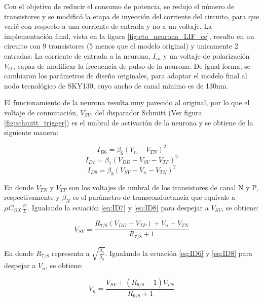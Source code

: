\documentclass[conference]{IEEEtran}
\begin{document}
Con el objetivo de reducir el consumo de potencia, se redujo el número de transistores y se modificó la etapa de inyección del corriente del circuito, para que varié con respecto a una corriente de entrada y no a un voltaje. La implementación final, vista en la figura \ref{fig:cto_neurona_LIF_cc}, resulto en un circuito con 9 transistores (5 menos que el modelo original) y unicamente 2 entradas: La corriente de entrada a la neurona, $I_{in}$ y un voltaje de polarización $V_{b1}$, capaz de modificar la frecuencia de pulso de la neurona. De igual forma, se cambiaron los parámetros de diseño originales, para adaptar el modelo final al nodo tecnológico de SKY130, cuyo ancho de canal mínimo es de 130nm.

El funcionamiento de la neurona resulta muy parecido al original, por lo que el voltaje de conmutación, $V_{SV}$, del disparador Schmitt (Ver figura \ref{fig:schmitt_trigger}) es el umbral de activación de la neurona y se obtiene de la siguiente manera:

\begin{equation}
	I_{D6} = \beta_{6}\left(V_{n}-V_{TN}\right)^{2}
	\label{eq:ID6}
\end{equation}
\begin{equation}
	I_{D7} = \beta_{7}\left(V_{DD}-V_{SV}-V_{TP}\right)^{2}
	\label{eq:ID7}
\end{equation}
\begin{equation}
	I_{D8} = \beta_{8}\left(V_{SV}-V_{n}-V_{TN}\right)^{2}
	\label{eq:ID8}
\end{equation}

En donde $V_{TN}$ y $V_{TP}$ son los voltajes de umbral de los transistores de canal N y P, respectivamente y $\beta_{N}$ es el parámetro de transconductancia que equivale a $\mu C_{OX} \frac{W}{L}$. Igualando la ecuación \ref{eq:ID7} y \ref{eq:ID8} para despejar a $V_{SV}$, se obtiene:

\begin{equation}
	V_{SV} = \frac{R_{7/8}(V_{DD}-V_{TP})+V_{n}+V_{TN}}{R_{7/8}+1}
	\label{eq:VSV1}
\end{equation}

En donde $R_{7/8}$ representa a $\sqrt{\frac{\beta_{7}}{\beta_{8}}}$. Igualando la ecuación \ref{eq:ID6} y \ref{eq:ID8} para despejar a $V_{n}$, se obtiene:

\begin{equation}
	V_{n} = \frac{V_{SV}+(R_{6/8}-1)V_{TN}}{R_{6/8}+1}
	\label{eq:Vn}
\end{equation}
\end{document}
